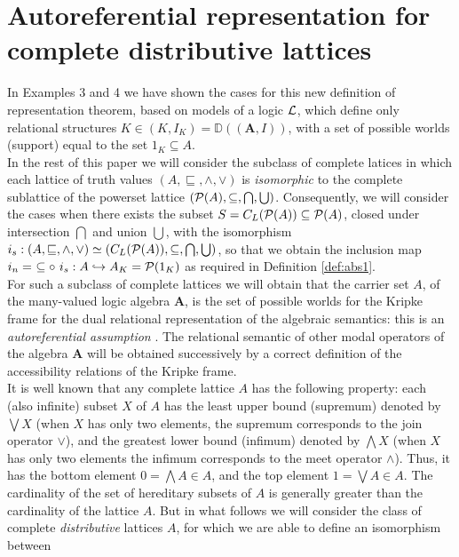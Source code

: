 \documentclass[10pt,twocolumn]{article}
\begin{document}
\section{Autoreferential representation for complete distributive lattices}
In  Examples 3 and 4 we have shown  the cases for  this new
definition of representation theorem, based on models of a logic
$\L$, which define only relational structures $K \in (K,I_K) =
\mathbb{D}((\textbf{A},I))$, with a set of possible worlds (support)
equal to
the set $1_K \subseteq A$. \\
In the rest of this paper we will consider the subclass of complete
latices in which each lattice of truth values $(A, \sqsubseteq,
\wedge, \vee)$  is \emph{isomorphic} to the complete sublattice of
the powerset lattice $(\P(A),\subseteq, \bigcap, \bigcup)$.
Consequently, we will consider the cases when there exists the
subset $S = C_L(\P(A)) \subseteq \P(A)$, closed under intersection
$\bigcap$ and union $\bigcup$, with the isomorphism $i_s:(A,
\sqsubseteq, \wedge, \vee) \simeq (C_L(\P(A)),\subseteq, \bigcap,
\bigcup)$, so that we obtain the inclusion map $i_n = ~\subseteq
\circ~ i_s:A \hookrightarrow A_K = \P(1_K) $ as required in Definition \ref{def:abs1}.\\
For such a subclass of complete lattices we will obtain that the
carrier set $A$, of the many-valued logic algebra $\textbf{A}$, is
the set of possible worlds for the Kripke frame for the  dual
relational representation of the algebraic semantics: this is an
\emph{autoreferential assumption} \cite{Majk06ml}. The relational
semantic of other modal operators
of the algebra $\textbf{A}$ will be obtained successively
by  a correct definition of the accessibility relations of the
Kripke frame.\\
It is well known that any complete lattice $A$ has the following
property: each (also infinite) subset $X$ of $A$ has the least upper
bound (supremum) denoted by $\bigvee X$ (when $X$ has only two
elements, the supremum corresponds to the join operator $\vee$), and
the greatest lower bound (infimum) denoted by $\bigwedge X$ (when
$X$ has only two elements  the infimum corresponds to the meet
operator $\wedge$). Thus, it has the bottom element $0 = \bigwedge A
\in A$, and the top element $1 = \bigvee A \in A$. The cardinality
of the set of hereditary subsets of $A$ is generally greater than
the cardinality of the lattice $A$. But in what follows we will
consider the class of complete \emph{distributive} lattices $A$, for
which we are able to define an isomorphism \cite{Birkh40} between
\end{document}
